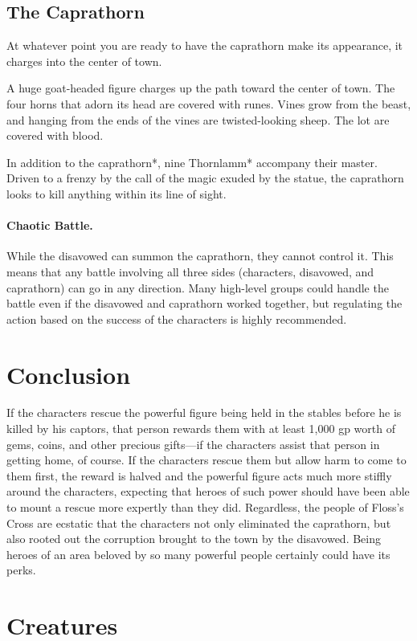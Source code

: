 \documentclass[10pt,a4paper,twoside,twocolumn,openany,bg=print,nodeprecatedcode]{dndbook}
\begin{document}
\subsection{The Caprathorn}
At whatever point you are ready to have the caprathorn make its appearance, it charges into the center of town.
\begin{DndReadAloud}{}
A huge goat-headed figure charges up the path toward the center of town. The four horns that adorn its head are covered with runes. Vines grow from the beast, and hanging from the ends of the vines are twisted-looking sheep. The lot are covered with blood.
\end{DndReadAloud}

In addition to the caprathorn*, nine Thornlamm* accompany their master. Driven to a frenzy by the call of the magic exuded by the statue, the caprathorn looks to kill anything within its line of sight.
\paragraph{Chaotic Battle.}
While the disavowed can summon the caprathorn, they cannot control it. This means that any battle involving all three sides (characters, disavowed, and caprathorn) can go in any direction. Many high-level groups could handle the battle even if the disavowed and caprathorn worked together, but regulating the action based on the success of the characters is highly recommended.
\section{Conclusion}
If the characters rescue the powerful figure being held in the stables before he is killed by his captors, that person rewards them with at least 1,000 gp worth of gems, coins, and other precious gifts—if the characters assist that person in getting home, of course.
If the characters rescue them but allow harm to come to them first, the reward is halved and the powerful figure acts much more stiffly around the characters, expecting that heroes of such power should have been able to mount a rescue more expertly than they did.
Regardless, the people of Floss's Cross are ecstatic that the characters not only eliminated the caprathorn, but also rooted out the corruption brought to the town by the disavowed. Being heroes of an area beloved by so many powerful people certainly could have its perks.
\section{Creatures}
\end{document}
